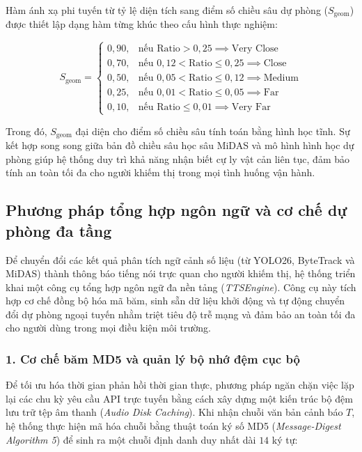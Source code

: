 Hàm ánh xạ phi tuyến từ tỷ lệ diện tích sang điểm số chiều sâu dự phòng ($S_{\text{geom}}$) được thiết lập dạng hàm từng khúc theo cấu hình thực nghiệm:

\begin{equation}
    S_{\text{geom}} = \begin{cases} 
        0,90, & \text{nếu } \text{Ratio} > 0,25 \implies \text{Very Close} \\
        0,70, & \text{nếu } 0,12 < \text{Ratio} \le 0,25 \implies \text{Close} \\
        0,50, & \text{nếu } 0,05 < \text{Ratio} \le 0,12 \implies \text{Medium} \\
        0,25, & \text{nếu } 0,01 < \text{Ratio} \le 0,05 \implies \text{Far} \\
        0,10, & \text{nếu } \text{Ratio} \le 0,01 \implies \text{Very Far}
    \end{cases}
\end{equation}

Trong đó, $S_{\text{geom}}$ đại diện cho điểm số chiều sâu tính toán bằng hình học tĩnh. Sự kết hợp song song giữa bản đồ chiều sâu học sâu MiDAS và mô hình hình học dự phòng giúp hệ thống duy trì khả năng nhận biết cự ly vật cản liên tục, đảm bảo tính an toàn tối đa cho người khiếm thị trong mọi tình huống vận hành.

\subsection{Phương pháp tổng hợp ngôn ngữ và cơ chế dự phòng đa tầng}

Để chuyển đổi các kết quả phân tích ngữ cảnh số liệu (từ YOLO26, ByteTrack và MiDAS) thành thông báo tiếng nói trực quan cho người khiếm thị, hệ thống triển khai một công cụ tổng hợp ngôn ngữ đa nền tảng (\textit{TTSEngine}). Công cụ này tích hợp cơ chế đồng bộ hóa mã băm, sinh sẵn dữ liệu khởi động và tự động chuyển đổi dự phòng ngoại tuyến nhằm triệt tiêu độ trễ mạng và đảm bảo an toàn tối đa cho người dùng trong mọi điều kiện môi trường.

\subsubsection*{1. Cơ chế băm MD5 và quản lý bộ nhớ đệm cục bộ}

Để tối ưu hóa thời gian phản hồi thời gian thực, phương pháp ngăn chặn việc lặp lại các chu kỳ yêu cầu API trực tuyến bằng cách xây dựng một kiến trúc bộ đệm lưu trữ tệp âm thanh (\textit{Audio Disk Caching}). Khi nhận chuỗi văn bản cảnh báo $T$, hệ thống thực hiện mã hóa chuỗi bằng thuật toán ký số MD5 (\textit{Message-Digest Algorithm 5}) để sinh ra một chuỗi định danh duy nhất dài $14$ ký tự:

